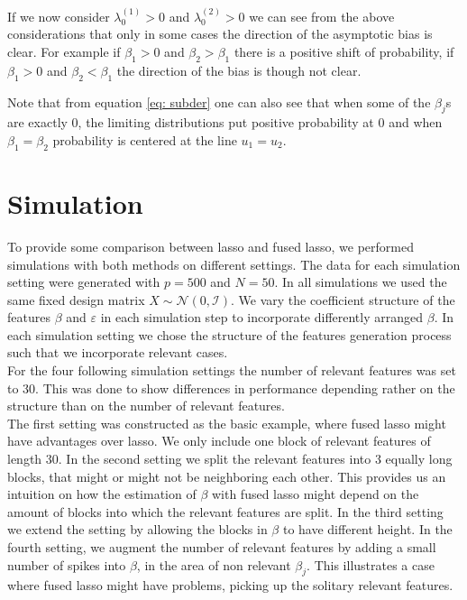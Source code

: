 \documentclass{article}
\theoremstyle{definition}
\begin{document}
If we now consider $\lambda_0^{(1)} > 0$ and $\lambda_0^{(2)} > 0$ we can see from the above considerations that only in some cases the direction of the asymptotic bias is clear. For example if $\beta_1 > 0$ and $\beta_2 > \beta_1$ there is a positive shift of probability, if $\beta_1 > 0$ and $\beta_2 < \beta_1$ the direction of the bias is though not clear.

Note that from equation \eqref{eq: subder} one can also see that when some of the $\beta_j$s are exactly $0$, the limiting distributions put positive probability at $0$ and when $\beta_1 = \beta_2$ probability is centered at the line $u_1 = u_2$. 


\newpage

\section{Simulation}

To provide some comparison between lasso and fused lasso, we performed simulations with both methods on different settings. The data for each simulation setting were generated with $p=500$ and $N=50$. In all simulations we used the same fixed design matrix $X\sim \mathcal{N}(0,\mathcal{I})$. We vary the coefficient structure of the features $\beta$ and $\varepsilon$ in each simulation step to incorporate differently arranged $\beta$. In each simulation setting we chose the structure of the features generation process such that we incorporate relevant cases.\\

For the four following simulation settings the number of relevant features was set to 30. This was done to show differences in performance depending rather on the structure than on the number of relevant features.\\
The first setting was constructed as the basic example, where fused lasso might have advantages over lasso. We only include one block of relevant features of length 30. In the second setting we split the relevant features into 3 equally long blocks, that might or might not be neighboring each other. This provides us an intuition on how the estimation of $\beta$ with fused lasso might depend on the amount of blocks into which the relevant features are split. In the third setting we extend the setting by allowing the blocks in $\beta$ to have different height. In the fourth setting, we augment the number of relevant features by adding a small number of spikes into $\beta$, in the area of non relevant $\beta_j$. This illustrates a case where fused lasso might have problems, picking up the solitary relevant features.\\
\end{document}
